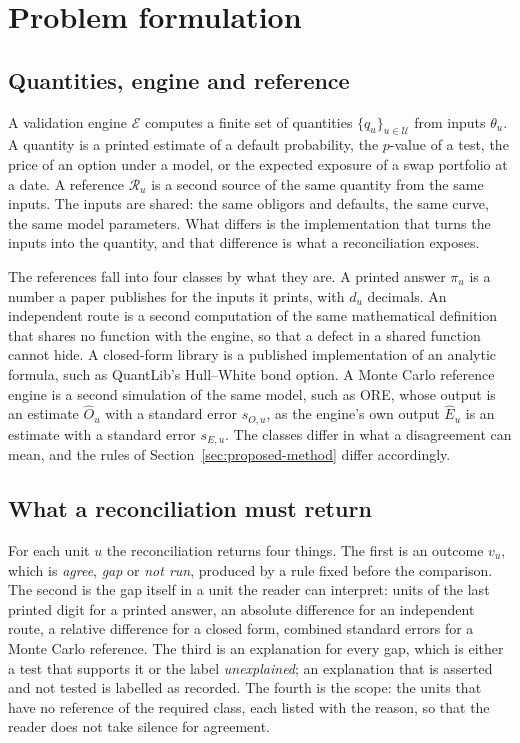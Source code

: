 \section{Problem formulation}
\label{sec:problem}

\subsection{Quantities, engine and reference}
\label{sec:problem-units}

A validation engine $\mathcal{E}$ computes a finite set of quantities $\{q_u\}_{u\in\mathcal{U}}$ from inputs $\theta_u$. A quantity is a printed estimate of a default probability, the $p$-value of a test, the price of an option under a model, or the expected exposure of a swap portfolio at a date. A reference $\mathcal{R}_u$ is a second source of the same quantity from the same inputs. The inputs are shared: the same obligors and defaults, the same curve, the same model parameters. What differs is the implementation that turns the inputs into the quantity, and that difference is what a reconciliation exposes.

The references fall into four classes by what they are. A printed answer $\pi_u$ is a number a paper publishes for the inputs it prints, with $d_u$ decimals. An independent route is a second computation of the same mathematical definition that shares no function with the engine, so that a defect in a shared function cannot hide. A closed-form library is a published implementation of an analytic formula, such as QuantLib's Hull--White bond option. A Monte Carlo reference engine is a second simulation of the same model, such as ORE, whose output is an estimate $\hat{O}_u$ with a standard error $s_{O,u}$, as the engine's own output $\hat{E}_u$ is an estimate with a standard error $s_{E,u}$. The classes differ in what a disagreement can mean, and the rules of Section~\ref{sec:proposed-method} differ accordingly.

\subsection{What a reconciliation must return}
\label{sec:problem-outputs}

For each unit $u$ the reconciliation returns four things. The first is an outcome $v_u$, which is \emph{agree}, \emph{gap} or \emph{not run}, produced by a rule fixed before the comparison. The second is the gap itself in a unit the reader can interpret: units of the last printed digit for a printed answer, an absolute difference for an independent route, a relative difference for a closed form, combined standard errors for a Monte Carlo reference. The third is an explanation for every gap, which is either a test that supports it or the label \emph{unexplained}; an explanation that is asserted and not tested is labelled as recorded. The fourth is the scope: the units that have no reference of the required class, each listed with the reason, so that the reader does not take silence for agreement.

